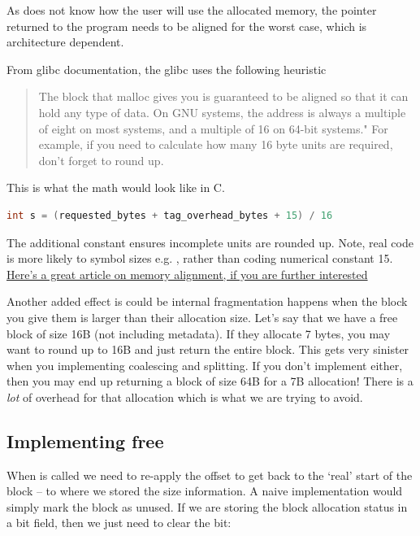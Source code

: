 As  does not know how the user will use the allocated memory, the pointer returned to the program needs to be aligned for the worst case, which is architecture dependent.

From glibc documentation, the glibc  uses the following heuristic \cite{vma_paging}

\begin{quote}
The block that malloc gives you is guaranteed to be aligned so that it can hold any type of data. On GNU systems, the address is always a multiple of eight on most systems, and a multiple of 16 on 64-bit systems." For example, if you need to calculate how many 16 byte units are required, don't forget to round up.
\end{quote}

This is what the math would look like in C.

\begin{lstlisting}[language=C]
int s = (requested_bytes + tag_overhead_bytes + 15) / 16
\end{lstlisting}

The additional constant ensures incomplete units are rounded up. Note, real code is more likely to symbol sizes e.g. , rather than coding numerical constant 15.
\href{http://www.ibm.com/developerworks/library/pa-dalign/}{Here's a great article on memory alignment, if you are further interested}

Another added effect is could be internal fragmentation happens when the block you give them is larger than their allocation size.
Let's say that we have a free block of size 16B (not including metadata).
If they allocate 7 bytes, you may want to round up to 16B and just return the entire block.
This gets very sinister when you implementing coalescing and splitting.
If you don't implement either, then you may end up returning a block of size 64B for a 7B allocation!
There is a \emph{lot} of overhead for that allocation which is what we are trying to avoid.

\subsection{Implementing free}

When  is called we need to re-apply the offset to get back to the `real' start of the block -- to where we stored the size information.
A naive implementation would simply mark the block as unused.
If we are storing the block allocation status in a bit field, then we just need to clear the bit:

